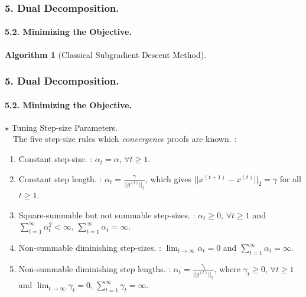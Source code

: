 \documentclass[11pt]{beamer}
\newtheorem*{pf of lemma}{\it Proof of the \normalfont \bf Lemma}
\newtheorem*{pf of claim}{\it Proof of the \normalfont \sf Claim}
\newtheorem{algorithm}{Algorithm}
\begin{document}
\begin{frame}
\frametitle{5. Dual Decomposition.}
\framesubtitle{5.2. Minimizing the Objective.}

\begin{algorithm} [Classical Subgradient Descent Method]
\end{algorithm}

\end{frame}

\begin{frame}
\frametitle{5. Dual Decomposition.}
\framesubtitle{5.2. Minimizing the Objective.}

$\star$ Tuning Step-size Parameters. \\
\ \ \indent The five step-size rules which \textit{convergence} proofs are known. :
\begin{enumerate}
\item Constant step-size. : $\alpha_t = \alpha$, $\forall t \geq 1$. \\
\item Constant step length. : $\alpha_t = \frac{\gamma}{||g^{(t)}||_2}$, which gives $||x^{(t+1)} - x^{(t)}||_2 = \gamma$ for all $t \geq 1$. \\
\item Square-summable but not summable step-sizes. : $\alpha_t \geq 0$, $\forall t \geq 1$ and $\sum_{t=1}^{\infty} \alpha_{t}^2 < \infty$, $\sum_{t=1}^{\infty} \alpha_t = \infty$. \\
\item Non-summable diminishing step-sizes. : $\lim_{t \rightarrow \infty} \alpha_t = 0$ and $\sum_{t=1}^{\infty} \alpha_t = \infty$. \\
\item Non-summable diminishing step lengths. : $\alpha_t = \frac{\gamma_t}{|| g^{(t)} ||_2}$, where $\gamma_t \geq 0$, $\forall t \geq 1$ and $\lim_{t \rightarrow \infty} \gamma_t = 0$, $\sum_{t=1}^{\infty} \gamma_t = \infty$.
\end{enumerate}

\end{frame}
\end{document}
